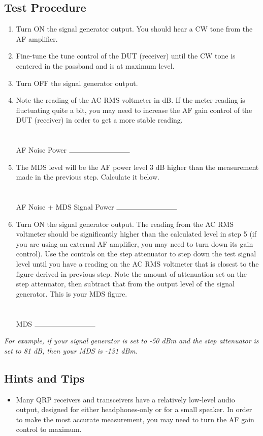 \documentclass[10pt,letterpaper]{book}
\begin{document}
\subsection*{Test Procedure}
\begin{enumerate}
	\item Turn ON the signal generator output. You should hear a CW tone from the AF amplifier.
	\item Fine-tune the tune control of the DUT (receiver) until the CW tone is centered in the passband and is at maximum level.
	\item Turn OFF the signal generator output.
	\item Note the reading of the AC RMS voltmeter in dB. If the meter reading is fluctuating quite a bit, you may need to increase the AF gain control of the DUT (receiver) in order to get a more stable reading. \\ \\ \\
	AF Noise Power $\rule{3cm}{0.1mm}$
	\item The MDS level will be the AF power level 3 dB higher than the measurement made in the previous step. Calculate it below. \\ \\ \\
	AF Noise + MDS Signal Power $\rule{3cm}{0.1mm}$
	\item Turn ON the signal generator output. The reading from the AC RMS voltmeter should be significantly higher than the calculated level in step 5 (if you are using an external AF amplifier, you may need to turn down its gain control). Use the controls on the step attenuator to step down the test signal level until you have a reading on the AC RMS voltmeter that is closest to the figure derived in previous step. Note the amount of attenuation set on the step attenuator, then subtract that from the output level of the signal generator. This is your MDS figure. \\ \\ \\
	MDS $\rule{3cm}{0.1mm}$
\end{enumerate}
\emph{For example, if your signal generator is set to -50 dBm and the step attenuator is set to 81 dB, then your MDS is -131 dBm.}
\subsection*{Hints and Tips}
\begin{itemize}
	\item Many QRP receivers and transceivers have a relatively low-level audio output, designed for either headphones-only or for a small speaker. In order to make the most accurate measurement, you may need to turn the AF gain control to maximum.
\end{itemize}
\end{document}
